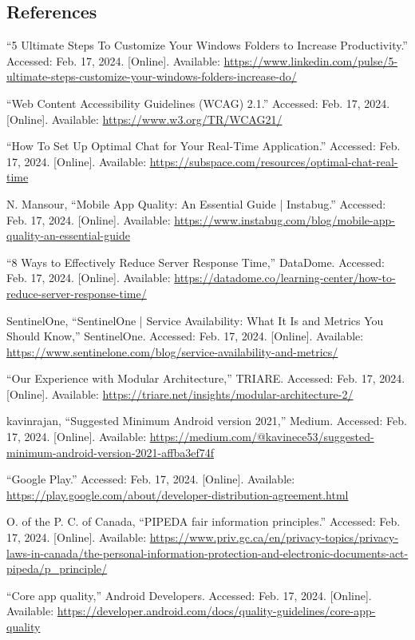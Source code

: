 \documentclass[]{article}
\begin{document}
\subsection{References}
\label{sub:references}
\begin{itemize}
	\begin{thebibliography}{99}
	         “5 Ultimate Steps To Customize Your Windows Folders to Increase Productivity.” Accessed: Feb. 17, 2024. [Online]. Available: \url{https://www.linkedin.com/pulse/5-ultimate-steps-customize-your-windows-folders-increase-do/}
	        
	         “Web Content Accessibility Guidelines (WCAG) 2.1.” Accessed: Feb. 17, 2024. [Online]. Available: \url{https://www.w3.org/TR/WCAG21/}
	        
	         “How To Set Up Optimal Chat for Your Real-Time Application.” Accessed: Feb. 17, 2024. [Online]. Available: \url{https://subspace.com/resources/optimal-chat-real-time}
	        
	         N. Mansour, “Mobile App Quality: An Essential Guide | Instabug.” Accessed: Feb. 17, 2024. [Online]. Available: \url{https://www.instabug.com/blog/mobile-app-quality-an-essential-guide}
	        
	         “8 Ways to Effectively Reduce Server Response Time,” DataDome. Accessed: Feb. 17, 2024. [Online]. Available: \url{https://datadome.co/learning-center/how-to-reduce-server-response-time/}
	        
	         SentinelOne, “SentinelOne | Service Availability: What It Is and Metrics You Should Know,” SentinelOne. Accessed: Feb. 17, 2024. [Online]. Available: \url{https://www.sentinelone.com/blog/service-availability-and-metrics/}
	        
	         “Our Experience with Modular Architecture,” TRIARE. Accessed: Feb. 17, 2024. [Online]. Available: \url{https://triare.net/insights/modular-architecture-2/}
	        
	         kavinrajan, “Suggested Minimum Android version 2021,” Medium. Accessed: Feb. 17, 2024. [Online]. Available: \url{https://medium.com/@kavinece53/suggested-minimum-android-version-2021-affba3ef74f}
	        
	         “Google Play.” Accessed: Feb. 17, 2024. [Online]. Available: \url{https://play.google.com/about/developer-distribution-agreement.html}
	        
	         O. of the P. C. of Canada, “PIPEDA fair information principles.” Accessed: Feb. 17, 2024. [Online]. Available: \url{https://www.priv.gc.ca/en/privacy-topics/privacy-laws-in-canada/the-personal-information-protection-and-electronic-documents-act-pipeda/p_principle/}
	        
	         “Core app quality,” Android Developers. Accessed: Feb. 17, 2024. [Online]. Available: \url{https://developer.android.com/docs/quality-guidelines/core-app-quality}
	    \end{thebibliography}


    
\end{itemize}
\end{document}
